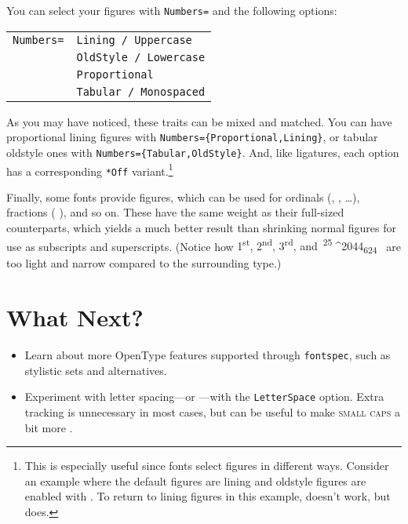 You can select your figures with \verb|Numbers=| and the following options:
\begin{leftfigure}
\begin{tabular}{l l}
\texttt{Numbers=} & \texttt{Lining / Uppercase} \\
 & \texttt{OldStyle / Lowercase} \\
 & \texttt{Proportional} \\
 & \texttt{Tabular / Monospaced}
\end{tabular}
\end{leftfigure}
As you may have noticed, these traits can be mixed and matched.
You can have proportional lining figures
with \verb|Numbers={Proportional,Lining}|,
or tabular oldstyle ones with \verb|Numbers={Tabular,OldStyle}|.
And, like ligatures, each option has a corresponding \verb|*Off|
variant.\punckern\footnote{This is especially useful since fonts
select figures in different ways.
Consider an example where the default figures are lining
and oldstyle figures are enabled with
.
To return to lining figures in this example,
doesn't work, but
does.}

Finally, some fonts provide  figures,
which can be used for ordinals
(,  , \ldots),
fractions (\,\,), and so on.
These have the same weight as their full-sized counterparts,
which yields a much better result than shrinking normal figures for use as
subscripts and superscripts.
(Notice how
{%
\mbox{1\textsuperscript{st}},
\mbox{2\textsuperscript{nd}},
\mbox{3\textsuperscript{rd}},
and
\,\mbox{\textsuperscript{25}^^^^2044\textsubscript{624}}%
\,}
are too light and narrow compared to the surrounding type.)

\section{What Next?}
\begin{itemize}
\item Learn about more OpenType features supported through \texttt{fontspec},
such as stylistic sets and alternatives.
\item Experiment with letter spacing---or ---with
    the \texttt{LetterSpace} option.
    Extra tracking is unnecessary in most cases,
    but can be useful to make \textsc{small caps}
    a bit more .
\end{itemize}
